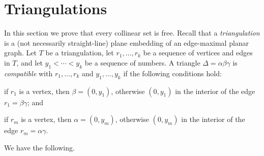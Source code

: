 \section{Triangulations}



In this section we prove that every collinear set is free. Recall that a {\em triangulation} is a (not necessarily straight-line) plane embedding of an edge-maximal planar graph. Let $T$ be a triangulation, let $r_1,\ldots,r_k$ be a sequence of vertices and edges in $T$, and let $y_1<\cdots<y_k$ be a sequence of numbers. A triangle $\Delta=\alpha\beta\gamma$ is \emph{compatible} with $r_1,\ldots,r_k$ and $y_1,\ldots,y_k$ if the following conditions hold:
\begin{compactenum}
	\item if $r_1$ is a vertex, then $\beta=(0,y_1)$, otherwise $(0, y_1)$ in the interior of the edge $r_1=\beta\gamma$; and
	\item if $r_m$ is a vertex, then $\alpha=(0,y_m)$, otherwise $(0,y_m)$ in the interior
	of the edge $r_m=\alpha\gamma$.
\end{compactenum}


We have the following.


